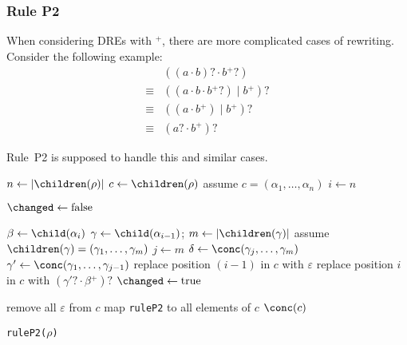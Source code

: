 \documentclass[a4paper,11pt, svgnames,titlepage]{article}
\newcommand{\rxp}{{^\mathtt{+}}}
\newcommand{\rxo}{\mathtt{?}}
\newcommand{\rxc}{\cdot}
\DeclareMathOperator{\ror}{\mathtt{|}}
\newcommand{\emptyword}{\varepsilon}
\newcommand{\true}{\ensuremath{\operatorname{true}}\xspace}
\newcommand{\false}{\ensuremath{\operatorname{false}}\xspace}
\begin{document}
\subsubsection{Rule P2}
When considering DREs with $\rxp$, there are more complicated cases of rewriting. Consider the following example:
\begin{align*}
	&( (a \rxc b)\rxo \rxc b\rxp\rxo)\\
	\equiv& ((a \rxc b \rxc b\rxp\rxo) \ror b\rxp)\rxo\\
	\equiv& ((a \rxc b\rxp) \ror b\rxp)\rxo\\
	\equiv& (a\rxo \rxc b\rxp)\rxo
\end{align*}

Rule~P2 is supposed to handle this and similar cases.

\begin{algorithm2e}[H]
	\SetAlgoLined

	{
		$n\leftarrow |\children(\rho)|$\;
		$c\leftarrow \children(\rho)$\;
		assume $c=(\alpha_1,\ldots,\alpha_n)$\;
		$i\leftarrow n$\;
		{
			$\changed\leftarrow\false$\;
			{
				$\beta\leftarrow \child(\alpha_{i})$ \tcp*[r]{Hence, $\alpha_i=\beta\rxp\rxo$}
				{
					$\gamma\leftarrow \child(\alpha_{i-1})$;
					$m\leftarrow |\children(\gamma)|$\;
					assume $\children(\gamma)=(\gamma_1,\ldots,\gamma_m)$\;
					$j\leftarrow m$\;
					{
						$\delta\leftarrow\conc(\gamma_j,\ldots,\gamma_m)$\;
						{
							$\gamma'\leftarrow \conc(\gamma_{1},\ldots,\gamma_{j-1})$\;
							replace position $(i-1)$ in $c$ with $\emptyword$\;
							replace position $i$ in $c$ with $(\gamma'\rxo \rxc\beta\rxp)\rxo$\;
							$\changed\leftarrow\true$\;
						}
					}
				}

			}
		}
		remove all $\emptyword$ from $c$\;
		map \texttt{ruleP2} to all elements of $c$\;
		\Return $\conc(c)$\;
	}

	\caption{\texttt{ruleP2(}$\rho$\texttt{)}}
\end{algorithm2e}
\end{document}
